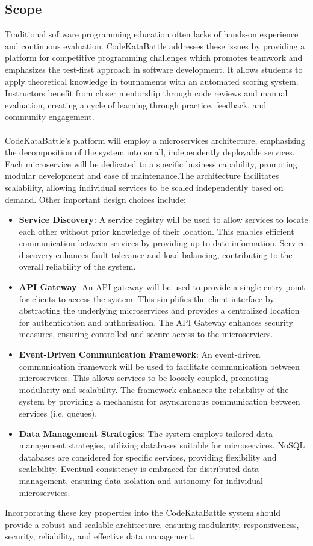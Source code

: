 \subsection{Scope}
Traditional software programming education often lacks of hands-on experience and continuous evaluation. CodeKataBattle addresses these issues by providing a platform for competitive programming challenges which promotes teamwork and emphasizes the test-first approach in software development. It allows students to apply theoretical knowledge in tournaments with an automated scoring system. Instructors benefit from closer mentorship through code reviews and manual evaluation, creating a cycle of learning through practice, feedback, and community engagement.
\\\\CodeKataBattle's platform will employ a microservices architecture, emphasizing the decomposition of the system into small, independently deployable services. Each microservice will be dedicated to a specific business capability, promoting modular development and ease of maintenance.The architecture facilitates scalability, allowing individual services to be scaled independently based on demand.
Other important design choices include:
\begin{itemize}
    \item \textbf{Service Discovery}: A service registry will be used to allow services to locate each other without prior knowledge of their location. This enables efficient communication between services by providing up-to-date information. Service discovery enhances fault tolerance and load balancing, contributing to the overall reliability of the system.
    \item \textbf{API Gateway}: An API gateway will be used to provide a single entry point for clients to access the system. This simplifies the client interface by abstracting the underlying microservices and provides a centralized location for authentication and authorization. The API Gateway enhances security measures, ensuring controlled and secure access to the microservices.
    \item \textbf{Event-Driven Communication Framework}: An event-driven communication framework will be used to facilitate communication between microservices. This allows services to be loosely coupled, promoting modularity and scalability. The framework enhances the reliability of the system by providing a mechanism for asynchronous communication between services (i.e. queues).
    \item \textbf{Data Management Strategies}: The system employs tailored data management strategies, utilizing databases suitable for microservices. NoSQL databases are considered for specific services, providing flexibility and scalability. Eventual consistency is embraced for distributed data management, ensuring data isolation and autonomy for individual microservices.
\end{itemize}
Incorporating these key properties into the CodeKataBattle system should provide a robust and scalable architecture, ensuring modularity, responsiveness, security, reliability, and effective data management.

